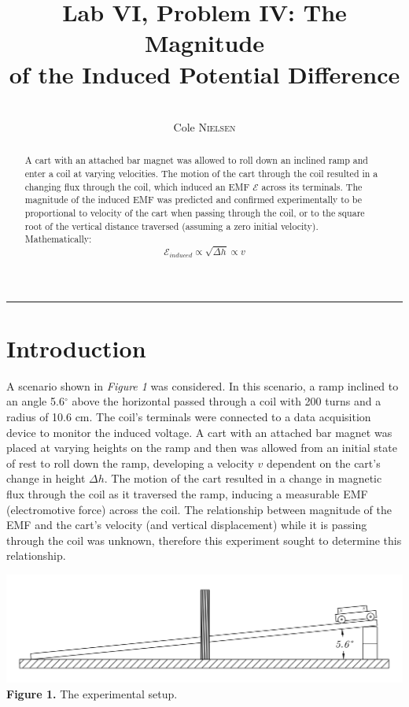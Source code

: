 \documentclass[12pt,letterpaper]{article}
\begin{document}
\title{Lab VI, Problem IV: The Magnitude\\ of the
Induced Potential Difference}
\author{\\\vspace{12pt}Cole \textsc{Nielsen}}
\date{}

\maketitle
\vspace{-12pt}\hrule
\begin{abstract}
\hspace{-16.5pt}A cart with an attached bar magnet was allowed to roll down an inclined ramp and enter a coil at varying velocities. The motion of the cart through the coil resulted in a changing flux through the coil, which induced an EMF $\mathcal{E}$ across its terminals. The magnitude of the induced EMF was predicted and confirmed experimentally to be proportional to velocity of the cart when passing through the coil, or to the square root of the vertical distance traversed (assuming a zero initial velocity). Mathematically: \\
\begin{equation}
\mathcal{E}_{induced} \propto \sqrt{\Delta h}\propto v
\end{equation}
\end{abstract}
\hrulefill
\vspace{-6pt}\section*{Introduction}
A scenario shown in \textit{Figure 1} was considered. In this scenario, a ramp inclined to an angle 5.6$^\circ$ above the horizontal passed through a coil with 200 turns and a radius of 10.6 cm. The coil's terminals were connected to a data acquisition device to monitor the induced voltage. A cart with an attached bar magnet was placed at varying heights on the ramp and then was allowed from an initial state of rest to roll down the ramp, developing a velocity $v$ dependent on the cart's change in height $\Delta h$. The motion of the cart resulted in a change in magnetic flux through the coil as it traversed the ramp, inducing a measurable EMF (electromotive force) across the coil. The relationship between magnitude  of the EMF and the cart's velocity (and vertical displacement) while it is passing through the coil was unknown, therefore this experiment sought to determine this relationship.
\begin{center}
\includegraphics[scale=0.4]{./graphics/physics2lr4.png}
\\\textbf{Figure 1.} The experimental setup.
\end{center}%
\end{document}
